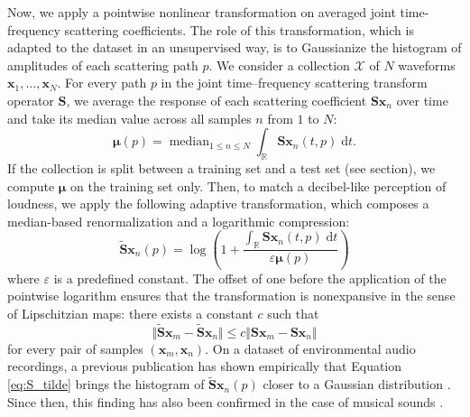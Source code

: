 \documentclass{bmcart}
\DeclareMathOperator*{\median}{median}
\newcommand{\lnameref}[1]{%
\bgroup
\let\nmu\MakeLowercase
\nameref{#1}\egroup}
\newcommand{\nmu}{}
\begin{document}
Now, we apply a pointwise nonlinear transformation on averaged joint time-frequency scattering coefficients.
The role of this transformation, which is adapted to the dataset in an unsupervised way, is to Gaussianize the histogram of amplitudes of each scattering path $p$.
We consider a collection $\mathcal{X}$ of $N$ waveforms $\boldsymbol{x}_1,\ldots,\boldsymbol{x}_N$. For every path $p$ in the joint time--frequency scattering transform operator $\mathbf{S}$, we average the response of each scattering coefficient $\mathbf{S}\boldsymbol{x}_n$ over time and take its median value across all samples $n$ from $1$ to $N$:
\begin{equation}
\boldsymbol{\mu}(p) =
\median_{1\leq n \leq N}
\int_{\mathbb{R}} \mathbf{S}\boldsymbol{x}_n(t, p) \;\mathrm{d}t.
\end{equation}
If the collection is split between a training set and a test set (see \lnameref{sec:discussion} section), we compute $\boldsymbol{\mu}$ on the training set only.
Then, to match a decibel-like perception of loudness, we apply the following adaptive transformation, which composes a median-based renormalization and a logarithmic compression:
\begin{equation}
\mathbf{\widetilde{S}}\boldsymbol{x}_n (p) =
\log \left(
1 +
\dfrac{
\int_\mathbb{R} \mathbf{S}\boldsymbol{x}_n (t, p) \;\mathrm{d}t
}{\varepsilon\boldsymbol{\mu}(p)}
\right)
\label{eq:S_tilde}
\end{equation}
where $\varepsilon$ is a predefined constant.
The offset of one before the application of the pointwise logarithm ensures that the transformation is nonexpansive in the sense of Lipschitzian maps: there exists a constant $c$ such that
\begin{equation}
\big \Vert
\mathbf{\widetilde{S}}\boldsymbol{x}_m
-
\mathbf{\widetilde{S}}\boldsymbol{x}_{n}
\big \Vert
\leq
c
\big \Vert
\mathbf{S}\boldsymbol{x}_m
-
\mathbf{S}\boldsymbol{x}_{n}
\big \Vert
\end{equation}
for every pair of samples $(\boldsymbol{x}_m, \boldsymbol{x}_n)$.
On a dataset of environmental audio recordings, a previous publication has shown empirically that Equation \ref{eq:S_tilde} brings the histogram of $\mathbf{\widetilde{S}}\boldsymbol{x}_n (p)$ closer to a Gaussian distribution \cite{lostanlen2018jasmp}.
Since then, this finding has also been confirmed in the case of musical sounds \cite{lostanlen2018extended}.
\end{document}
